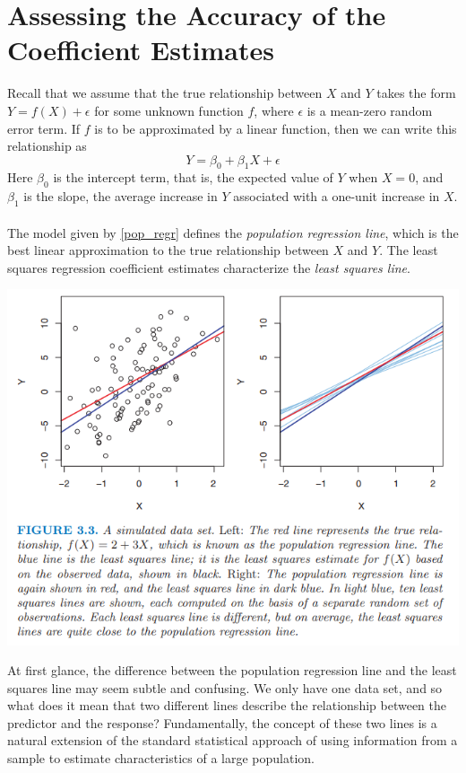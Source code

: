\section{Assessing the Accuracy of the Coefficient Estimates}
Recall that we assume that the true relationship between $X$ and $Y$ takes the form $Y = f(X) + \epsilon$ for some unknown function $f$, where $\epsilon$ is a mean-zero random error term. If $f$ is to be approximated by a linear function, then we can write this relationship as
\begin{equation}
    Y = \beta_0 + \beta_1X + \epsilon
    \label{pop_regr}
\end{equation}
Here $\beta_0$ is the intercept term, that is, the expected value of $Y$ when $X = 0$,
and $\beta_1$ is the slope, the average increase in $Y$ associated with a one-unit increase in $X$.\\\\
The model given by \ref{pop_regr} defines the \textit{population regression line}, which is the best linear approximation to the true relationship between $X$ and $Y$. The least squares regression coefficient estimates characterize the \textit{least squares line}.
\begin{center}
    \includegraphics[scale=0.8]{images/pop_reg vs lsr.png}
\end{center}
At first glance, the difference between the population regression line and the least squares line may seem subtle and confusing. We only have one data set, and so what does it mean that two different lines describe the relationship between the predictor and the response? Fundamentally, the concept of these two lines is a natural extension of the standard statistical approach of using information from a sample to estimate characteristics of a large population.\\\\
